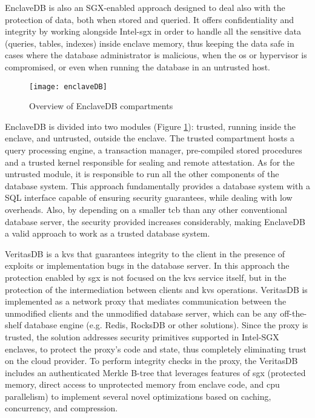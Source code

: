 
EnclaveDB \cite{enclavedbPaper} is also an SGX-enabled approach designed to deal also with the protection of data, both when stored and queried. It offers confidentiality and integrity by working alongside Intel-\gls{sgx} in order to handle all the sensitive data (queries, tables, indexes) inside enclave memory, thus keeping the data safe in cases  where the database administrator is malicious, when the \gls{os} or hypervisor is compromised, or even when running the database in an untrusted host.

\begin{figure}[htbp]
	\centering
	{\texttt{[image: enclaveDB]}}
	\caption{Overview of EnclaveDB compartments}
	\label{fig:enclaveDB}
\end{figure}
 
EnclaveDB is divided into two modules (Figure \ref{fig:enclaveDB}): trusted, running inside the enclave, and untrusted, outside the enclave. The trusted compartment hosts a query processing engine, a transaction manager, pre-compiled stored procedures and a trusted kernel responsible for sealing and remote attestation. As for the untrusted module, it is responsible to run all the other components of the database system. 
This approach fundamentally provides a database system with a SQL interface capable of ensuring security guarantees, while dealing with low overheads. Also, by depending on a smaller \gls{tcb} than any other conventional database server, the security provided increases considerably, making EnclaveDB a valid approach to work as a trusted database system.

VeritasDB \cite{veritasDB} is a \gls{kvs} that guarantees integrity to the client in the presence of exploits or implementation bugs in the database server. In this approach the protection enabled by \gls{sgx} is not focused on the \gls{kvs} service itself, but in the protection of the intermediation between clients and \gls{kvs} operations. VeritasDB is implemented as a network proxy that mediates communication between the unmodified clients and the unmodified database server, which can be any off-the-shelf database engine (e.g. Redis, RocksDB or other solutions). Since the proxy is trusted, the solution addresses security primitives supported in Intel-SGX enclaves, to protect the proxy’s code and state, thus completely eliminating trust on the cloud provider. To perform integrity checks in the proxy, the VeritasDB includes an authenticated Merkle B-tree that leverages features of \gls{sgx} (protected memory, direct access to unprotected memory from enclave code, and \gls{cpu} parallelism) to implement several novel optimizations based on caching, concurrency, and compression.

